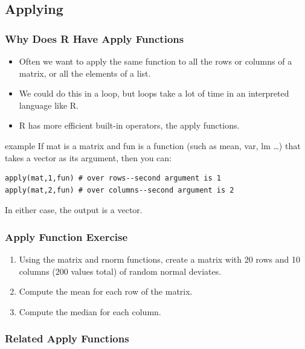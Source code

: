 \documentclass[]{article}
\theoremstyle{definition}
\theoremstyle{definition}
\theoremstyle{remark}
\begin{document}
\subsection{Applying}\label{applying}

\subsubsection{Why Does R Have Apply
Functions}\label{why-does-r-have-apply-functions}

\begin{itemize}
\item
  {Often we want to apply the same function to all the rows or columns
  of a matrix, or all the elements of a list.}
\item
  {We could do this in a loop, but loops take a lot of time in an
  interpreted language like R.}
\item
  {R has more efficient built-in operators, the apply functions.}
\end{itemize}

{example} If mat is a matrix and fun is a function (such as mean, var,
lm \ldots{}) that takes a vector as its argument, then you can:

\begin{verbatim}
apply(mat,1,fun) # over rows--second argument is 1      
apply(mat,2,fun) # over columns--second argument is 2
\end{verbatim}

In either case, the output is a vector.

\subsubsection{Apply Function Exercise}\label{apply-function-exercise}

\begin{enumerate}
\def\labelenumi{\arabic{enumi}.}
\item
  {Using the matrix and rnorm functions, create a matrix with 20 rows
  and 10 columns (200 values total) of random normal deviates.}
\item
  {Compute the mean for each row of the matrix.}
\item
  {Compute the median for each column.}
\end{enumerate}

\subsubsection{Related Apply Functions}\label{related-apply-functions}
\end{document}
